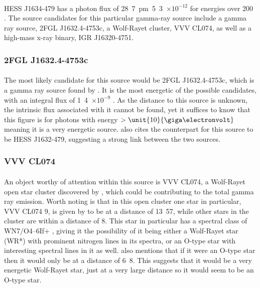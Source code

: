\documentclass[a4paper, titlepage, oneside]{article}
\newcommand{\e}[1]{\ensuremath{\times 10^{#1}}}
\newcommand{\parsec}{\mathrm{pc}}
\newcommand{\photon}{\mathrm{ph}}
\begin{document}
\begin{multicols}{2}
\paragraph{}
HESS J1634-479 has a photon flux of \unit{28.7\pm5.3\e{-12}}{\photon\usk\centi\metre\rpsquared\usk\reciprocal\second} for energies over \unit{200}{\giga\electronvolt} \parencite{Aharonian:2006}. The source candidates for this particular gamma-ray source include a gamma ray source, 2FGL J1632.4-4753c, a Wolf-Rayet cluster, VVV CL074, as well as a high-mass x-ray binary, IGR J16320-4751.

\subsubsection{2FGL J1632.4-4753c}
\paragraph{}
The most likely candidate for this source would be 2FGL J1632.4-4753c, which is a gamma ray source found by \textcite{Lande:2012}. It is the most energetic of the possible candidates, with an integral flux of \unit{1.4\e{-9}}{\photon\usk\centi\metre\rpsquared\usk\reciprocal\second} \parencite{Lande:2012}. As the distance to this source is unknown, the intrinsic flux associated with it cannot be found, yet it suffices to know that this figure is for photons with energy \(>\unit{10}{\giga\electronvolt}\) meaning it is a very energetic source. \textcite{Lande:2012} also cites the counterpart for this source to be HESS J1632-479, suggesting a strong link between the two sources.

\subsubsection{VVV CL074}
\paragraph{}
An object worthy of attention within this source is VVV CL074, a Wolf-Rayet open star cluster discovered by \textcite{Chene:2013}, which could be contributing to the total gamma ray emission. Worth noting is that in this open cluster one star in particular, VVV CL074 9, is given by \textcite{Chene:2013} to be at a distance of \unit{13.57}{\kilo\parsec}, while other stars in the cluster are within a distance of \unit{8}{\kilo\parsec}. This star in particular has a spectral class of WN7/O4–6If+ \parencite{Chene:2013}, giving it the possibility of it being either a Wolf-Rayet star (WR*) with prominent nitrogen lines in its spectra, or an O-type star with interesting spectral lines in it as well. \textcite{Chene:2013} also mentions that if it were an O-type star then it would only be at a distance of \unit{6.8}{\kilo\parsec}. This suggests that it would be a very energetic Wolf-Rayet star, just at a very large distance so it would seem to be an O-type star.


\end{multicols}
\end{document}
